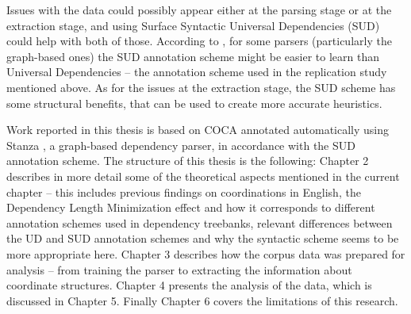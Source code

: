 Issues with the data could possibly appear either at the parsing stage or at the extraction stage, and using Surface Syntactic Universal Dependencies (SUD) could help with both of those. According to \cite{tuo:prz:lac:21}, for some parsers (particularly the graph-based ones) the SUD annotation scheme might be easier to learn than Universal Dependencies -- the annotation scheme used in the replication study mentioned above. As for the issues at the extraction stage, the SUD scheme has some structural benefits, that can be used to create more accurate heuristics.


Work reported in this thesis is based on COCA annotated automatically using Stanza \citep{qi2020stanza}, a graph-based dependency parser, in accordance with the SUD annotation scheme. The structure of this thesis is the following: Chapter 2 describes in more detail some of the theoretical aspects mentioned in the current chapter -- this includes previous findings on coordinations in English, the Dependency Length Minimization effect and how it corresponds to different annotation schemes used in dependency treebanks, relevant differences between the UD and SUD annotation schemes and why the syntactic scheme seems to be more appropriate here. Chapter 3 describes how the corpus data was prepared for analysis -- from training the parser to extracting the information about coordinate structures. Chapter 4 presents the analysis of the data, which is discussed in Chapter 5. Finally Chapter 6 covers the limitations of this research. 